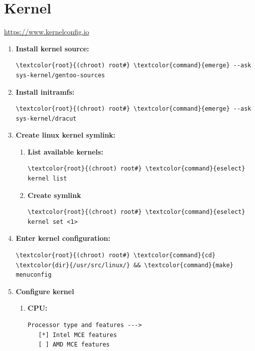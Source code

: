 \documentclass[10pt, a4paper, onecolumn, oneside, titlepage, openany]{book}
\begin{document}
\section{Kernel}
\url{https://www.kernelconfig.io}
\begin{enumerate}
    \item \textbf{Install kernel source:}
\begin{Verbatim}[commandchars=\\\{\}]
\textcolor{root}{(chroot) root#} \textcolor{command}{emerge} --ask sys-kernel/gentoo-sources
\end{Verbatim}
    \item \textbf{Install initramfs:}
\begin{Verbatim}[commandchars=\\\{\}]
\textcolor{root}{(chroot) root#} \textcolor{command}{emerge} --ask sys-kernel/dracut
\end{Verbatim}
    \item \textbf{Create linux kernel symlink:}
    \begin{enumerate}
        \item \textbf{List available kernels:}
\begin{Verbatim}[commandchars=\\\{\}]
\textcolor{root}{(chroot) root#} \textcolor{command}{eselect} kernel list
\end{Verbatim}
        \item \textbf{Create symlink}
\begin{Verbatim}[commandchars=\\\{\}]
\textcolor{root}{(chroot) root#} \textcolor{command}{eselect} kernel set <1>
\end{Verbatim}
    \end{enumerate}
    \item \textbf{Enter kernel configuration:}
\begin{Verbatim}[commandchars=\\\{\}]
\textcolor{root}{(chroot) root#} \textcolor{command}{cd} \textcolor{dir}{/usr/src/linux/} && \textcolor{command}{make} menuconfig
\end{Verbatim}
    \item \textbf{Configure kernel}
    \begin{enumerate}
        \item \textbf{CPU:}
\begin{Verbatim}[commandchars=\\\{\}]
Processor type and features --->
   [*] Intel MCE features
   [ ] AMD MCE features

\end{Verbatim}
\end{enumerate}
\end{enumerate}
\end{document}
